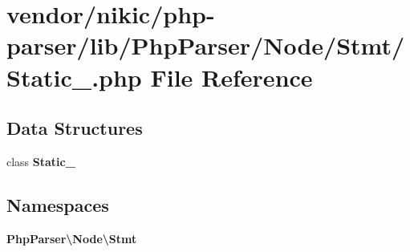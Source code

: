 \section{vendor/nikic/php-\/parser/lib/\+Php\+Parser/\+Node/\+Stmt/\+Static\+\_\+.php File Reference}
\label{_static___8php}
\subsection*{Data Structures}
\begin{DoxyCompactItemize}
\item 
class {\bf Static\+\_\+}
\end{DoxyCompactItemize}
\subsection*{Namespaces}
\begin{DoxyCompactItemize}
\item 
 {\bf Php\+Parser\textbackslash{}\+Node\textbackslash{}\+Stmt}
\end{DoxyCompactItemize}

